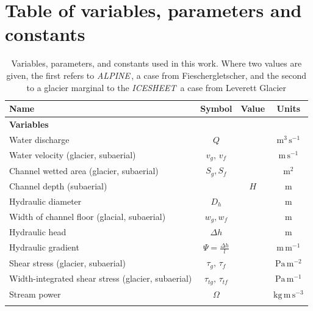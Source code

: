 \documentclass[draft]{agujournal2019}
\newcommand{\alpine}{\textit{ALPINE}\,}
\newcommand{\icesheet}{\textit{ICESHEET}\,}
\begin{document}
\section{Table of variables, parameters and constants}
\begin{table}[h]
  \centering
  \caption{Variables, parameters, and constants used in this work.
    Where two values are given, the first refers to  \alpine{}, a case from Fieschergletscher, and the second to a glacier marginal to the \icesheet{} a case from Leverett Glacier}
  \begin{tabular}{ l  c  c c }
    Name &Symbol&  Value&Units \\ \hline
    \textbf{Variables}  & & & \\
    Water discharge  & $Q$& & $\mathrm{m^{3}\,s^{-1}}$ \\
    Water velocity (glacier, subaerial)  & $v_g,\,v_{f}$& & $\mathrm{m\,s^{-1}}$ \\
    Channel wetted area (glacier, subaerial) &  $S_g, S_f$& & $\mathrm{m^2}$     \\
    Channel depth (subaerial) & &$H$& $\mathrm{m}$\\
    Hydraulic diameter &$D_h$&&$\mathrm{m}$\\
    Width of channel floor (glacial, subaerial) & $w_g,w_f$&  & $\mathrm{m}$     \\
    Hydraulic head &$\Delta h$&& $\mathrm{m}$\\
    Hydraulic gradient &$\Psi=\frac{\Delta h}{l}$&& $\mathrm{m\, m^{-1}}$\\

    Shear stress (glacier, subaerial) & $\tau_g,\,\tau_f$&& $\mathrm{Pa \, m^{-2}}$ \\
    Width-integrated shear stress (glacier, subaerial) & $\tau_{tg},\, \tau_{tf}$&& $\mathrm{Pa \, m^{-1}}$ \\
    Stream power & $\Omega$ && $\mathrm{ kg \, m\, s^{-3}}$ \\

         &&&\\


\end{tabular}
\end{table}
\end{document}
